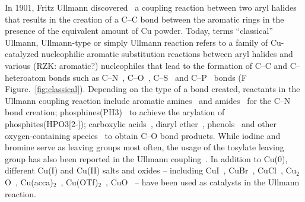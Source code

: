 \documentclass[aps,reprint,amsmath,amssymb]{revtex4-2}
\begin{document}
In 1901, Fritz Ullmann discovered~\cite{ullmann_01} a coupling reaction between two aryl halides that results in the creation of a C--C bond between the aromatic rings 
in the presence of the equivalent amount of Cu powder.
Today, terms ``classical'' Ullmann, Ullmann-type or simply Ullmann reaction refers to a family of Cu-catalyzed nucleophilic aromatic substitution reactions between aryl halides and various (RZK: aromatic?) nucleophiles that lead to the formation of C--C and C--heteroatom bonds 
%
%
%
such as C--N~\cite{ullmann_02, ullmann_03}, C--O~\cite{ullmann_04}, C--S~\cite{ullmann_05} and C--P~\cite{ullmann_21,ullmann_22} bonds (F
Figure.~\ref{fig:classical}). 
%
Depending on the type of a bond created, reactants in the Ullmann coupling reaction include aromatic amines~\cite{ullmann_17,ullmann_18} and amides~\cite{ullmann_19,ullmann_20} for the C--N bond creation; phosphines(PH3)~\cite{ullmann_21,ullmann_22} to achieve the arylation of phosphites(HPO3[2-]); carboxylic acids~\cite{ullmann_23}, diaryl ether~\cite{ullmann_24}, phenols~\cite{ullmann_25} and other oxygen-containing species~\cite{ullmann_26,ullmann_27,ullmann_28} to obtain C--O bond products.
%
While iodine and bromine serve as leaving groups most often, the usage of the tosylate leaving group has also been reported in the Ullmann coupling~\cite{ullmann_15}. 
%
In addition to Cu(0), different Cu(I) and Cu(II) salts and oxides -- including CuI~\cite{ullmann_07,ullmann_08,ullmann_09}, CuBr~\cite{ullmann_10,ullmann_11}, CuCl~\cite{ullmann_13}, Cu$_2$O~\cite{ullmann_12}, Cu(acca)$_2$~\cite{ullmann_14}, Cu(OTf)$_2$~\cite{ullmann_15}, CuO~\cite{ullmann_16} -- have been used as catalysts in the Ullmann reaction.
\end{document}
